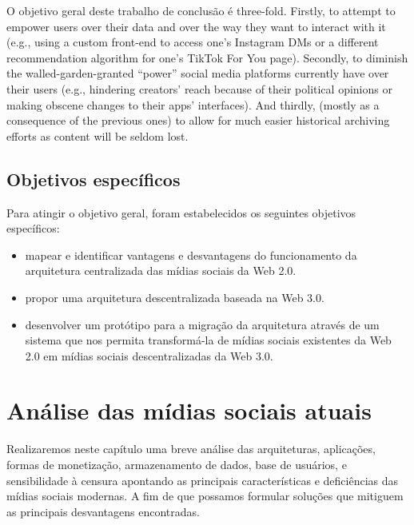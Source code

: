 O objetivo geral deste trabalho de conclusão é three-fold.
Firstly, to attempt to empower users over their data and over the way they want to interact with it (e.g., using a custom front-end to access one's Instagram DMs or a different recommendation algorithm for one's TikTok For You page).
Secondly, to diminish the walled-garden-granted ``power'' social media platforms currently have over their users (e.g., hindering creators' reach because of their political opinions or making obscene changes to their apps' interfaces).
And thirdly, (mostly as a consequence of the previous ones) to allow for much easier historical archiving efforts as content will be seldom lost\footnotemark.

\section{Objetivos específicos}

Para atingir o objetivo geral, foram estabelecidos os seguintes objetivos específicos:

\begin{itemize}
    \item mapear e identificar vantagens e desvantagens do funcionamento da arquitetura centralizada das mídias sociais da Web 2.0.
    \item propor uma arquitetura descentralizada baseada na Web 3.0.
    \item desenvolver um protótipo para a migração da arquitetura através de um sistema que nos permita transformá-la de mídias sociais existentes da Web 2.0 em mídias sociais descentralizadas da Web 3.0.
\end{itemize}

\chapter{Análise das mídias sociais atuais}

Realizaremos neste capítulo uma breve análise das arquiteturas, aplicações, formas de monetização, armazenamento de dados, base de usuários, e sensibilidade à censura apontando as principais características e deficiências das mídias sociais modernas. 
A fim de que possamos formular soluções que mitiguem as principais desvantagens encontradas.


